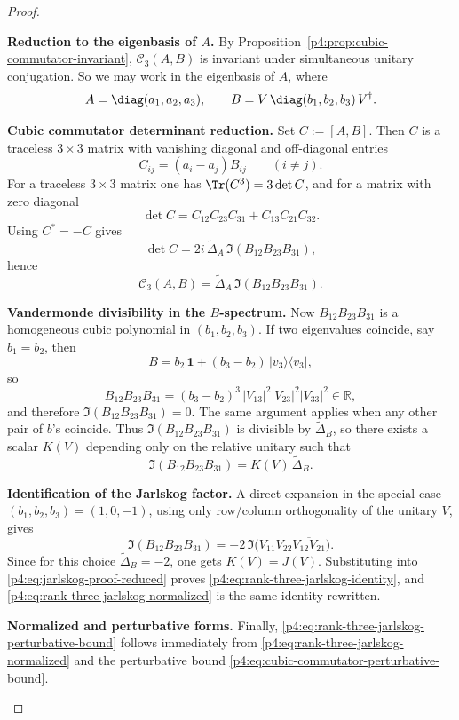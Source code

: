 \documentclass[12pt,a4paper]{article}
\begin{document}
\begin{proof}
\begin{proofsteps}

\item \textbf{Reduction to the eigenbasis of \(A\).}
By Proposition~\ref{p4:prop:cubic-commutator-invariant}, $\mathcal C_3(A,B)$ is invariant under simultaneous unitary conjugation.
So we may work in the eigenbasis of $A$, where
\[
A=\diag(a_1,a_2,a_3),
\qquad
B=V\,\diag(b_1,b_2,b_3)\,V^\dagger.
\]

\item \textbf{Cubic commutator determinant reduction.}
Set $C:=[A,B]$.
Then $C$ is a traceless $3\times 3$ matrix with vanishing diagonal and off-diagonal entries
\[
C_{ij}=(a_i-a_j)B_{ij}
\qquad (i\neq j).
\]
For a traceless $3\times 3$ matrix one has $\Tr(C^3)=3\det C$, and for a matrix with zero diagonal
\[
\det C = C_{12}C_{23}C_{31}+C_{13}C_{21}C_{32}.
\]
Using $C^*=-C$ gives
\[
\det C
=
2i\,\widetilde\Delta_A\,\Im(B_{12}B_{23}B_{31}),
\]
hence
\begin{equation}
\label{p4:eq:jarlskog-proof-reduced}
\mathcal C_3(A,B)
=
\widetilde\Delta_A\,\Im(B_{12}B_{23}B_{31}).
\end{equation}


\item \textbf{Vandermonde divisibility in the \(B\)-spectrum.}
Now $B_{12}B_{23}B_{31}$ is a homogeneous cubic polynomial in $(b_1,b_2,b_3)$.
If two eigenvalues coincide, say $b_1=b_2$, then
\[
B=b_2\,\mathbf 1 +(b_3-b_2)\,|v_3\rangle\langle v_3|,
\]
so
\[
B_{12}B_{23}B_{31}
=
(b_3-b_2)^3\,|V_{13}|^2|V_{23}|^2|V_{33}|^2\in\mathbb R,
\]
and therefore $\Im(B_{12}B_{23}B_{31})=0$.
The same argument applies when any other pair of $b$'s coincide.
Thus $\Im(B_{12}B_{23}B_{31})$ is divisible by $\widetilde\Delta_B$, so there exists a scalar $K(V)$ depending only on the relative unitary such that
\[
\Im(B_{12}B_{23}B_{31})=K(V)\,\widetilde\Delta_B.
\]

\item \textbf{Identification of the Jarlskog factor.}
A direct expansion in the special case $(b_1,b_2,b_3)=(1,0,-1)$, using only row/column orthogonality of the unitary $V$, gives
\[
\Im(B_{12}B_{23}B_{31})
=
-2\,\Im\!\bigl(V_{11}V_{22}\overline{V_{12}V_{21}}\bigr).
\]
Since for this choice $\widetilde\Delta_B=-2$, one gets $K(V)=J(V)$.
Substituting into \eqref{p4:eq:jarlskog-proof-reduced} proves \eqref{p4:eq:rank-three-jarlskog-identity}, and \eqref{p4:eq:rank-three-jarlskog-normalized} is the same identity rewritten.


\item \textbf{Normalized and perturbative forms.}
Finally, \eqref{p4:eq:rank-three-jarlskog-perturbative-bound} follows immediately from
\eqref{p4:eq:rank-three-jarlskog-normalized} and the perturbative bound
\eqref{p4:eq:cubic-commutator-perturbative-bound}.
\end{proofsteps}

\end{proof}
\end{document}
